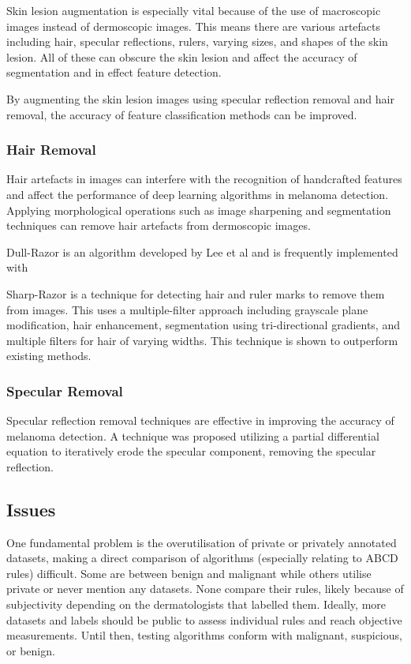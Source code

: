 Skin lesion augmentation is especially vital because of the use of macroscopic images instead of dermoscopic images. This means there are various artefacts including hair, specular reflections, rulers, varying sizes, and shapes of the skin lesion. All of these can obscure the skin lesion and affect the accuracy of segmentation\cite{Unver2019} and in effect feature detection.

By augmenting the skin lesion images using specular reflection removal and hair removal, the accuracy of feature classification methods can be improved\cite{kasmi2023}. 

\subsubsection{Hair Removal}
Hair artefacts in images can interfere with the recognition of handcrafted features and affect the performance of deep learning algorithms in melanoma detection\cite{kasmi2023}. Applying morphological operations such as image sharpening and segmentation techniques can remove hair artefacts from dermoscopic images\cite{kasmi2023}.

Dull-Razor is an algorithm developed by Lee et al\cite{Lee1997} and is frequently implemented with 

Sharp-Razor\cite{kasmi2023} is a technique for detecting hair and ruler marks to remove them from images. This uses a multiple-filter approach including grayscale plane modification, hair enhancement, segmentation using tri-directional gradients, and multiple filters for hair of varying widths. This technique is shown to outperform existing methods.

\subsubsection{Specular Removal}
Specular reflection removal techniques are effective in improving the accuracy of melanoma detection\cite{Shen2009}. A technique was proposed utilizing a partial differential equation to iteratively erode the specular component, removing the specular reflection\cite{Shen2009}.


\subsection{Issues}
One fundamental problem is the overutilisation of private or privately annotated datasets, making a direct comparison of algorithms (especially relating to ABCD rules) difficult. Some are between benign and malignant\cite{Meskini2018, Kasmi2016, Ali2020b, Ali2020a} while others utilise private or never mention any datasets\cite{Kasmi2016, She2007, Tenenhaus2010, Ramezani2014, Zaqout2016}. None compare their rules, likely because of subjectivity depending on the dermatologists that labelled them. Ideally, more datasets and labels should be public to assess individual rules and reach objective measurements. Until then, testing algorithms conform with malignant, suspicious, or benign.

